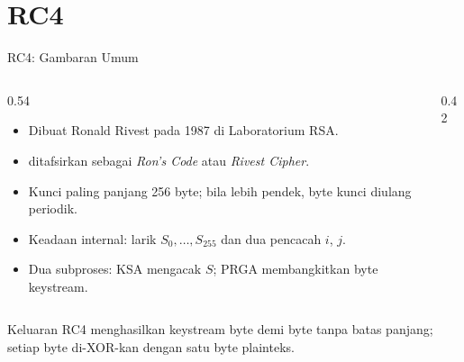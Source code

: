 \documentclass[aspectratio=169,11pt]{beamer}
\begin{document}
\section{RC4}

\begin{frame}{RC4: Gambaran Umum}
    \footnotesize
    \begin{columns}[T,onlytextwidth]
        \begin{column}{0.54\textwidth}
            \begin{itemize}
                \item Dibuat Ronald Rivest pada 1987 di Laboratorium RSA.
                \item {} ditafsirkan sebagai \textit{Ron's Code} atau
                      \textit{Rivest Cipher}.
                \item Kunci paling panjang 256 byte; bila lebih pendek,
                      byte kunci diulang periodik.
                \item Keadaan internal: larik $S_0,\dots,S_{255}$ dan dua
                      pencacah $i$, $j$.
                \item Dua subproses: KSA mengacak $S$; PRGA membangkitkan
                      byte keystream.
            \end{itemize}
        \end{column}
        \begin{column}{0.42\textwidth}
            \centering
        \end{column}
    \end{columns}
    \vspace{0.1cm}
    \begin{block}{Keluaran}
        RC4 menghasilkan keystream byte demi byte tanpa batas panjang;
        setiap byte di-XOR-kan dengan satu byte plainteks.
    \end{block}
\end{frame}
\end{document}
